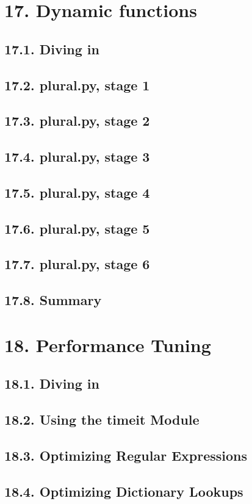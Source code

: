 \documentclass[oneside,12pt]{book}
\begin{document}
\chapter{17. Dynamic functions}
\section{17.1. Diving in}
\section{17.2. plural.py, stage 1}
\section{17.3. plural.py, stage 2}
\section{17.4. plural.py, stage 3}
\section{17.5. plural.py, stage 4}
\section{17.6. plural.py, stage 5}
\section{17.7. plural.py, stage 6}
\section{17.8. Summary}
   
\chapter{18. Performance Tuning}
\section{18.1. Diving in}
\section{18.2. Using the timeit Module}
\section{18.3. Optimizing Regular Expressions}
\section{18.4. Optimizing Dictionary Lookups}
\end{document}
